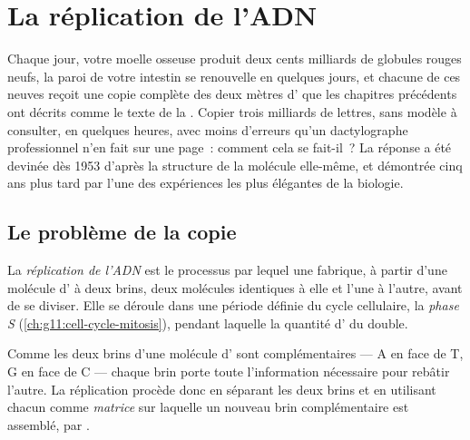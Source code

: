 \chapter{La réplication de l'ADN}\label{ch:g11:dna-replication}

Chaque jour, votre moelle osseuse produit deux cents milliards de
globules rouges neufs, la paroi de votre intestin se renouvelle en
quelques jours, et chacune de ces  neuves reçoit une copie
complète des deux mètres d' que les chapitres précédents ont décrits
comme le texte de la . Copier trois milliards de lettres, sans
modèle à consulter, en quelques heures, avec moins d'erreurs qu'un
dactylographe professionnel n'en fait sur une page~: comment cela
se fait-il~? La réponse a été devinée dès 1953 d'après la structure de
la molécule elle-même, et démontrée cinq ans plus tard par l'une des
expériences les plus élégantes de la biologie.

\section{Le problème de la copie}

\begin{definition}[Réplication]\label{def:g11:dna-replication:replication}
La \emph{réplication de l'ADN} est le
processus par lequel une  fabrique, à partir d'une molécule
d' à deux brins, deux molécules identiques à elle et l'une à
l'autre, avant de se diviser. Elle se déroule dans une période définie
du cycle cellulaire, la \emph{phase S}
(\cref{ch:g11:cell-cycle-mitosis}), pendant laquelle la quantité d'
du  double.
\end{definition}

\begin{proposition}\label{prop:g11:dna-replication:template}
Comme les deux brins d'une molécule d' sont complémentaires --- A en
face de T, G en face de C --- chaque brin porte toute l'information
nécessaire pour rebâtir l'autre. La réplication procède donc en
séparant les deux brins et en utilisant chacun comme \emph{matrice} sur
laquelle un nouveau brin complémentaire est assemblé,  par
.
\end{proposition}
\admitted

